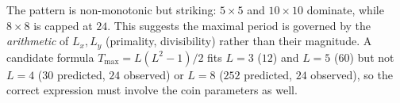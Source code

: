 \noindent The pattern is non-monotonic but striking: $5\times5$ and
$10\times10$ dominate, while $8\times8$ is capped at $24$. This suggests
the maximal period is governed by the \emph{arithmetic} of $L_x,L_y$
(primality, divisibility) rather than their magnitude. A candidate
formula $T_{\max}=L(L^2-1)/2$ fits $L=3$ ($12$) and $L=5$ ($60$) but not
$L=4$ ($30$ predicted, $24$ observed) or $L=8$ ($252$ predicted, $24$
observed), so the correct expression must involve the coin parameters
as well.
